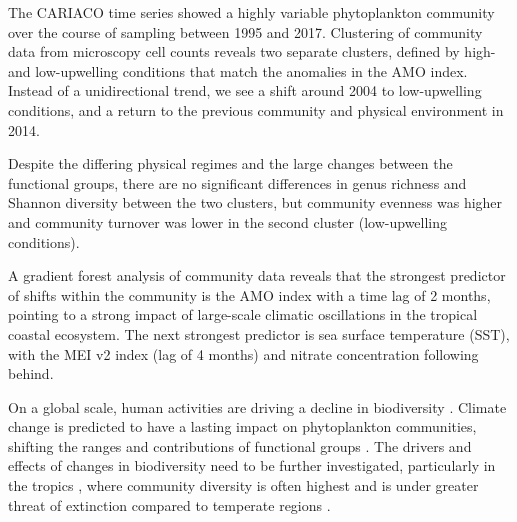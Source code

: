 \begin{keypoints}
\item The CARIACO time series showed a highly variable phytoplankton community over the course of sampling between 1995 and 2017. Clustering of community data from microscopy cell counts reveals two separate clusters, defined by high- and low-upwelling conditions that match the anomalies in the AMO index. 
\index Instead of a unidirectional trend, we see a shift around 2004 to low-upwelling conditions, and a return to the previous community and physical environment in 2014. 
\item Despite the differing physical regimes and the large changes between the functional groups, there are no significant differences in genus richness and Shannon diversity between the two clusters, but community evenness was higher and community turnover was lower in the second cluster (low-upwelling conditions).
\item A gradient forest analysis of community data reveals that the strongest predictor of shifts within the community is the AMO index with a time lag of 2 months, pointing to a strong impact of large-scale climatic oscillations in the tropical coastal ecosystem. The next strongest predictor is sea surface temperature (SST), with the MEI v2 index (lag of 4 months) and nitrate concentration following behind. 
\end{keypoints}





    On a global scale, human activities are driving a decline in biodiversity \cite{tittensor_mid-term_2014}. Climate change is predicted to have a lasting impact on phytoplankton communities, shifting the ranges and contributions of functional groups \cite{henson_future_2021}. The drivers and effects of changes in biodiversity need to be further investigated, particularly in the tropics \cite{clarke_does_2017}, where community diversity is often highest \cite{brown_why_2014, righetti_global_2019} and is under greater threat of extinction compared to temperate regions \cite{finnegan_paleontological_2015}.






